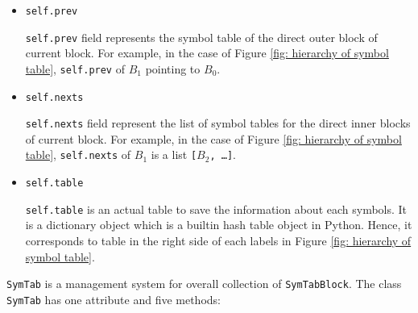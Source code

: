 \documentclass{article}
\newcommand{\code}[1]{\texttt{#1}}
\begin{document}
	\begin{itemize}
		\item \code{self.prev}
		
		\code{self.prev} field represents the symbol table of the direct outer block of current block. For example, in the case of Figure \ref{fig: hierarchy of symbol table}, \code{self.prev} of $B_1$ pointing to $B_0$.
		
		\item \code{self.nexts}
		
		\code{self.nexts} field represent the list of symbol tables for the direct inner blocks of current block. For example, in the case of Figure \ref{fig: hierarchy of symbol table}, \code{self.nexts} of $B_1$ is a list \code{[$B_2$, \dots]}.
		
		\item \code{self.table}
		
		\code{self.table} is an actual table to save the information about each symbols. It is a dictionary object which is a builtin hash table object in Python. Hence, it corresponds to table in the right side of each labels in Figure \ref{fig: hierarchy of symbol table}.
	\end{itemize}
	
	\code{SymTab} is a management system for overall collection of \code{SymTabBlock}. The class \code{SymTab} has one attribute and five methods:
	
\end{document}
